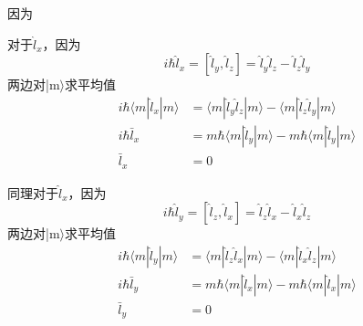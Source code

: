 因为

对于$\hat{l}_x$，因为
$$
i\hbar \hat{l}_x=\left[ \hat{l}_y,\hat{l}_z \right] =\hat{l}_y\hat{l}_z-\hat{l}_z\hat{l}_y
$$
两边对|m$\rangle$求平均值
\begin{align}
i\hbar \left. \langle m|\hat{l}_x|m \right. \rangle &=\langle m|\hat{l}_y\hat{l}_z|m\rangle -\left. \langle m\left| \hat{l}_z\hat{l}_y \right|m \right. \rangle\\
	i\hbar \bar{l}_x&=m\hbar \langle m|\hat{l}_y|m\rangle -m\hbar \left. \langle m|\hat{l}_y|m \right. \rangle \\
	\bar{l}_x&=0
\end{align}

同理对于$\hat{l}_x$，因为
$$
i\hbar \hat{l}_y=\left[ \hat{l}_z,\hat{l}_x \right] =\hat{l}_z\hat{l}_x-\hat{l}_x\hat{l}_z
$$
两边对|m$\rangle$求平均值
\begin{align}
i\hbar \left. \langle m|\hat{l}_y|m \right. \rangle &=\langle m|\hat{l}_z\hat{l}_x|m\rangle -\left. \langle m\left| \hat{l}_x\hat{l}_z \right|m \right. \rangle\\
	i\hbar \bar{l}_y&=m\hbar \langle m|\hat{l}_x|m\rangle -m\hbar \left. \langle m|\hat{l}_x|m \right. \rangle \\
	\bar{l}_y&=0
\end{align}